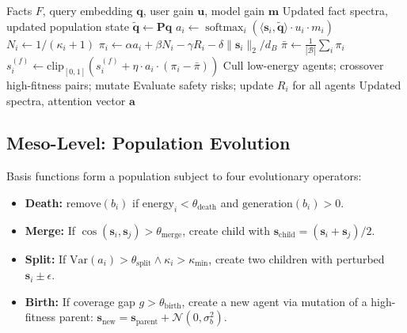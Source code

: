 \documentclass[review]{elsarticle}
\DeclareMathOperator*{\softmax}{softmax}
\begin{document}
\begin{algorithm}[t]
\caption{ReplicatorDynamicsUpdate (Single Cognitive Cycle)}
\label{alg:update}
\begin{algorithmic}[1]
\Require Facts $F$, query embedding $\mathbf{q}$, user gain $\mathbf{u}$, model gain $\mathbf{m}$
\Ensure Updated fact spectra, updated population state
\State $\tilde{\mathbf{q}} \gets \mathbf{P}\mathbf{q}$ 
  \State $a_i \gets \softmax_i(\langle \mathbf{s}_i, \tilde{\mathbf{q}}\rangle \cdot u_i \cdot m_i)$
  \State $N_i \gets 1 / (\kappa_i + 1)$ 
  \State $\pi_i \gets \alpha a_i + \beta N_i - \gamma R_i - \delta \|\mathbf{s}_i\|_2/d_B$
\EndFor
\State $\bar{\pi} \gets \frac{1}{|\mathcal{B}|}\sum_i \pi_i$
    \State $s_i^{(f)} \gets \text{clip}_{[0,1]}(s_i^{(f)} + \eta \cdot a_i \cdot (\pi_i - \bar{\pi}))$
  \EndFor
\EndFor
{}
  \State Cull low-energy agents; crossover high-fitness pairs; mutate
\EndIf
{}
  \State Evaluate safety risks; update $R_i$ for all agents
\EndIf
\State \Return Updated spectra, attention vector $\mathbf{a}$
\end{algorithmic}
\end{algorithm}

\subsection{Meso-Level: Population Evolution}

Basis functions form a population subject to four evolutionary operators:

\begin{itemize}[leftmargin=*,itemsep=0pt]
\item \textbf{Death:} $\text{remove}(b_i)$ if $\text{energy}_i <
  \theta_{\text{death}}$ and $\text{generation}(b_i) > 0$.
\item \textbf{Merge:} If $\cos(\mathbf{s}_i, \mathbf{s}_j) > \theta_{\text{merge}}$,
  create child with $\mathbf{s}_{\text{child}} = (\mathbf{s}_i + \mathbf{s}_j)/2$.
\item \textbf{Split:} If $\text{Var}(a_i) > \theta_{\text{split}} \land
  \kappa_i > \kappa_{\min}$, create two children with perturbed
  $\mathbf{s}_i \pm \epsilon$.
\item \textbf{Birth:} If coverage gap $g > \theta_{\text{birth}}$, create
  a new agent via mutation of a high-fitness parent: $\mathbf{s}_{\text{new}}
  = \mathbf{s}_{\text{parent}} + \mathcal{N}(0, \sigma^2_b)$.
\end{itemize}
\end{document}
